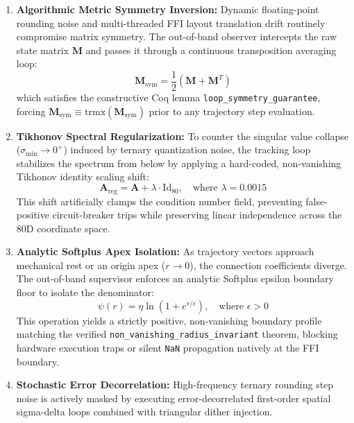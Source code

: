 \begin{enumerate}
    \item \textbf{Algorithmic Metric Symmetry Inversion:} Dynamic floating-point rounding noise and multi-threaded FFI layout translation drift routinely compromise matrix symmetry. The out-of-band observer intercepts the raw state matrix $\mathbf{M}$ and passes it through a continuous transposition averaging loop:
    \begin{equation}
    \mathbf{M}_{\mathrm{sym}} = \frac{1}{2}\left(\mathbf{M} + \mathbf{M}^T\right)
    \end{equation}
    which satisfies the constructive Coq lemma \texttt{loop\_symmetry\_guarantee}, forcing $\mathbf{M}_{\mathrm{sym}} \equiv \mathrm{trmx}(\mathbf{M}_{\mathrm{sym}})$ prior to any trajectory step evaluation.
    
    \item \textbf{Tikhonov Spectral Regularization:} To counter the singular value collapse ($\sigma_{\min} \to 0^+$) induced by ternary quantization noise, the tracking loop stabilizes the spectrum from below by applying a hard-coded, non-vanishing Tikhonov identity scaling shift:
    \begin{equation}
    \mathbf{A}_{\mathrm{reg}} = \mathbf{A} + \lambda \cdot \mathrm{Id}_{80}, \quad \text{where } \lambda = 0.0015
    \end{equation}
    This shift artificially clamps the condition number field, preventing false-positive circuit-breaker trips while preserving linear independence across the 80D coordinate space.
    
    \item \textbf{Analytic Softplus Apex Isolation:} As trajectory vectors approach mechanical rest or an origin apex ($r \to 0$), the connection coefficients diverge. The out-of-band supervisor enforces an analytic Softplus epsilon boundary floor to isolate the denominator:
    \begin{equation}
    \psi(r) = \eta \ln\left(1 + e^{r/\epsilon}\right), \quad \text{where } \epsilon > 0
    \end{equation}
    This operation yields a strictly positive, non-vanishing boundary profile matching the verified \texttt{non\_vanishing\_radius\_invariant} theorem, blocking hardware execution traps or silent \texttt{NaN} propagation natively at the FFI boundary.
    
    \item \textbf{Stochastic Error Decorrelation:} High-frequency ternary rounding step noise is actively masked by executing error-decorrelated first-order spatial sigma-delta loops combined with triangular dither injection.
\end{enumerate}

